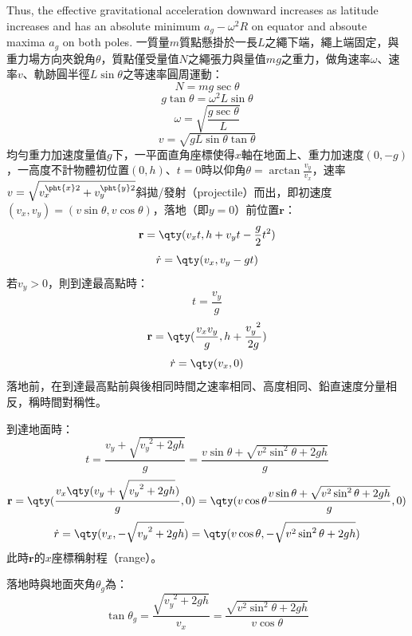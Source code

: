 \documentclass[a4paper,12pt]{article}
\begin{document}
Thus, the effective gravitational acceleration downward increases as latitude increases and has an absolute minimum $a_g-\omega^2R$ on equator and absoute maxima $a_g$ on both poles.
一質量$m$質點懸掛於一長$L$之繩下端，繩上端固定，與重力場方向夾銳角$\theta$，質點僅受量值$N$之繩張力與量值$mg$之重力，做角速率$\omega$、速率$v$、軌跡圓半徑$L\sin\theta$之等速率圓周運動：
\[N=mg\sec\theta\]
\[g\tan\theta=\omega^2L\sin\theta\]
\[\omega=\sqrt{\frac{g\sec\theta}{L}}\]
\[v=\sqrt{gL\sin\theta\tan\theta}\]
均勻重力加速度量值$g$下，一平面直角座標使得$x$軸在地面上、重力加速度$(0,-g)$，一高度不計物體初位置$(0,h)$、$t=0$時以仰角$\theta=\arctan\frac{v_y}{v_x}$，速率$v=\sqrt{v_x^{\pht{x}2}+v_y^{\pht{y}2}}$斜拋/發射（projectile）而出，即初速度$(v_x,v_y)=(v\sin\theta,v\cos\theta)$，落地（即$y=0$）前位置$\mathbf{r}$：
\[\mathbf{r}=\qty(v_xt,h+v_yt-\frac{g}{2}t^2)\]
\[\dot{r}=\qty(v_x,v_y-gt)\]
若$v_y>0$，則到達最高點時：
\[t=\frac{v_y}{g}\]
\[\mathbf{r}=\qty(\frac{v_xv_y}{g},h+\frac{v_y^{\phantom{y}2}}{2g})\]
\[\dot{r}=\qty(v_x,0)\]
落地前，在到達最高點前與後相同時間之速率相同、高度相同、鉛直速度分量相反，稱時間對稱性。

到達地面時：
\[t=\frac{v_y+\sqrt{v_y^{\phantom{y}2}+2gh}}{g}=\frac{v\sin\theta+\sqrt{v^2\sin^2\theta+2gh}}{g}\]
\[\mathbf{r}=\qty(\frac{v_x\qty(v_y+\sqrt{v_y^{\phantom{y}2}+2gh})}{g},0)=\qty(v\cos\theta\frac{v\sin\theta+\sqrt{v^2\sin^2\theta+2gh}}{g},0)\]
\[\dot{r}=\qty(v_x,-\sqrt{v_y^{\phantom{y}2}+2gh})=\qty(v\cos\theta,-\sqrt{v^2\sin^2\theta+2gh})\]
此時$\mathbf{r}$的$x$座標稱射程（range）。

落地時與地面夾角$\theta_g$為：
\[\tan\theta_g=\frac{\sqrt{v_y^{\phantom{y}2}+2gh}}{v_x}=\frac{\sqrt{v^2\sin^2\theta+2gh}}{v\cos\theta}\]
\end{document}
